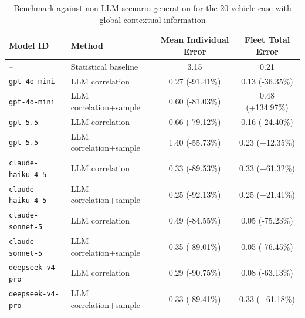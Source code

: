 \begin{table}[ht]
\centering
\caption{Benchmark against non-LLM scenario generation for the 20-vehicle case with global contextual information}
\label{tab:llm-api-benchmark-global}
\begin{tabular}{l l c c}
\hline
\textbf{Model ID} & \textbf{Method} & \textbf{Mean Individual Error} & \textbf{Fleet Total Error} \\
\hline
-- & Statistical baseline & 3.15 & 0.21 \\
\hline
\texttt{gpt-4o-mini} & LLM correlation & 0.27 (-91.41\%) & 0.13 (-36.35\%) \\
\texttt{gpt-4o-mini} & LLM correlation+sample & 0.60 (-81.03\%) & 0.48 (+134.97\%) \\
\hline
\texttt{gpt-5.5} & LLM correlation & 0.66 (-79.12\%) & 0.16 (-24.40\%) \\
\texttt{gpt-5.5} & LLM correlation+sample & 1.40 (-55.73\%) & 0.23 (+12.35\%) \\
\hline
\texttt{claude-haiku-4-5} & LLM correlation & 0.33 (-89.53\%) & 0.33 (+61.32\%) \\
\texttt{claude-haiku-4-5} & LLM correlation+sample & 0.25 (-92.13\%) & 0.25 (+21.41\%) \\
\hline
\texttt{claude-sonnet-5} & LLM correlation & 0.49 (-84.55\%) & 0.05 (-75.23\%) \\
\texttt{claude-sonnet-5} & LLM correlation+sample & 0.35 (-89.01\%) & 0.05 (-76.45\%) \\
\hline
\texttt{deepseek-v4-pro} & LLM correlation & 0.29 (-90.75\%) & 0.08 (-63.13\%) \\
\texttt{deepseek-v4-pro} & LLM correlation+sample & 0.33 (-89.41\%) & 0.33 (+61.18\%) \\
\hline
\end{tabular}
\end{table}
